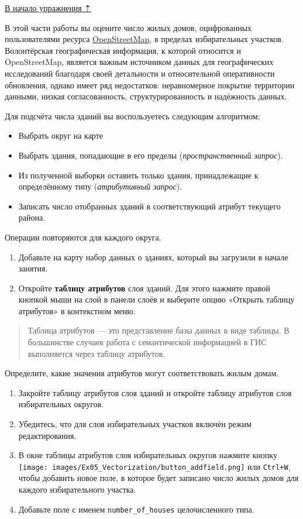 \documentclass[
  12pt,
]{book}
\begin{document}
\protect\hyperlink{digitizingf-districts}{В начало упражнения ⇡}

В этой части работы вы оцените число жилых домов, оцифрованных пользователями ресурса \href{https://www.openstreetmap.org/}{OpenStreetMap}, в пределах избирательных участков. Волонтёрская географическая информация, к которой относится и OpenStreetMap, является важным источником данных для географических исследований благодаря своей детальности и относительной оперативности обновления, однако имеет ряд недостатков: неравномерное покрытие территории данными, низкая согласованность, структурированность и надёжность данных.

Для подсчёта числа зданий вы воспользуетесь следующим алгоритмом:

\begin{itemize}
\item
  Выбрать округ на карте
\item
  Выбрать здания, попадающие в его пределы (\emph{пространственный запрос}).
\item
  Из полученной выборки оставить только здания, принадлежащие к определённому типу (\emph{атрибутивный запрос}).
\item
  Записать число отобранных зданий в соответствующий атрибут текущего района.
\end{itemize}

Операции повторяются для каждого округа.

\begin{enumerate}
\def\labelenumi{\arabic{enumi}.}
\item
  Добавьте на карту набор данных о зданиях, который вы загрузили в начале занятия.
\item
  Откройте \textbf{таблицу атрибутов} слоя зданий. Для этого нажмите правой кнопкой мыши на слой в панели слоёв и выберите опцию «Открыть таблицу атрибутов» в контекстном меню.
\end{enumerate}

\begin{quote}
Таблица атрибутов --- это представление базы данных в виде таблицы. В большинстве случаев работа с семантической информацией в ГИС выполняется через таблицу атрибутов.
\end{quote}

Определите, какие значения атрибутов могут соответствовать жилым домам.

\begin{enumerate}
\def\labelenumi{\arabic{enumi}.}
\setcounter{enumi}{1}
\item
  Закройте таблицу атрибутов слоя зданий и откройте таблицу атрибутов слоя избирательных округов.
\item
  Убедитесь, что для слоя избирательных участков включён режим редактирования.
\item
  В окне таблицы атрибутов слоя избирательных округов нажмите кнопку \texttt{[image: images/Ex05\_Vectorization/button\_addfield.png]} или \texttt{Ctrl+W}, чтобы добавить новое поле, в которое будет записано число жилых домов для каждого избирательного участка.
\item
  Добавьте поле с именем \texttt{number\_of\_houses} целочисленного типа.
\end{enumerate}
\end{document}
